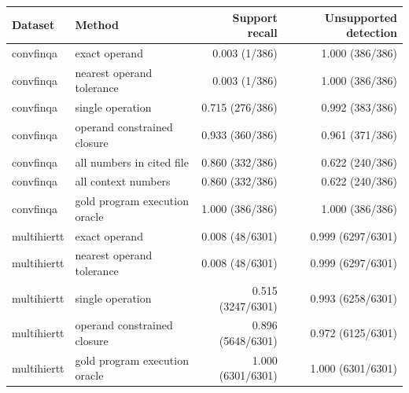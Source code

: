 \begin{tabular}{llrr}
\toprule
Dataset & Method & Support recall & Unsupported detection \\
\midrule
convfinqa & exact operand & 0.003 (1/386) & 1.000 (386/386) \\
convfinqa & nearest operand tolerance & 0.003 (1/386) & 1.000 (386/386) \\
convfinqa & single operation & 0.715 (276/386) & 0.992 (383/386) \\
convfinqa & operand constrained closure & 0.933 (360/386) & 0.961 (371/386) \\
convfinqa & all numbers in cited file & 0.860 (332/386) & 0.622 (240/386) \\
convfinqa & all context numbers & 0.860 (332/386) & 0.622 (240/386) \\
convfinqa & gold program execution oracle & 1.000 (386/386) & 1.000 (386/386) \\
multihiertt & exact operand & 0.008 (48/6301) & 0.999 (6297/6301) \\
multihiertt & nearest operand tolerance & 0.008 (48/6301) & 0.999 (6297/6301) \\
multihiertt & single operation & 0.515 (3247/6301) & 0.993 (6258/6301) \\
multihiertt & operand constrained closure & 0.896 (5648/6301) & 0.972 (6125/6301) \\
multihiertt & gold program execution oracle & 1.000 (6301/6301) & 1.000 (6301/6301) \\
\bottomrule
\end{tabular}
